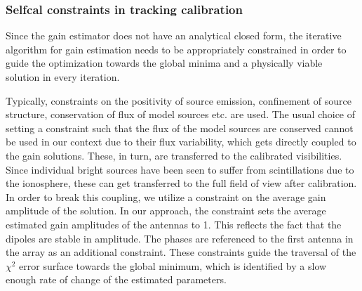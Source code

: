 \documentclass{aa}
\begin{document}
\begin{table}[tbh]
\caption{\label{tab:Details-of-model}Details of model sources used for All-sky
Selfcal. The $S_{60}$ has been generated using the spectral indices
of \citep{helmboldt2008radio}, while a secular decrease in the flux
of CasA of -0.8\% has been assumed. }
\end{table}



\subsubsection{Selfcal constraints in tracking calibration}

Since the gain estimator does not have an analytical closed form,
the iterative algorithm for gain estimation needs to be appropriately
constrained in order to guide the optimization towards the global
minima and a physically viable solution in every iteration.

Typically, constraints on the positivity of source emission, confinement
of source structure, conservation of flux of model sources etc. are
used. The usual choice of setting a constraint such that the flux
of the model sources are conserved cannot be used in our context due
to their flux variability, which gets directly coupled to the gain
solutions. These, in turn, are transferred to the calibrated visibilities.
Since individual bright sources have been seen to suffer from scintillations
due to the ionosphere, these can get transferred to the full field
of view after calibration. In order to break this coupling, we utilize
a constraint on the average gain amplitude of the solution. In our
approach, the constraint sets the average estimated gain amplitudes
of the antennas to 1. This reflects the fact that the dipoles are
stable in amplitude. The phases are referenced to the first antenna
in the array as an additional constraint. These constraints guide
the traversal of the $\chi^{2}$ error surface towards the global
minimum, which is identified by a slow enough rate of change of the
estimated parameters.
\end{document}

